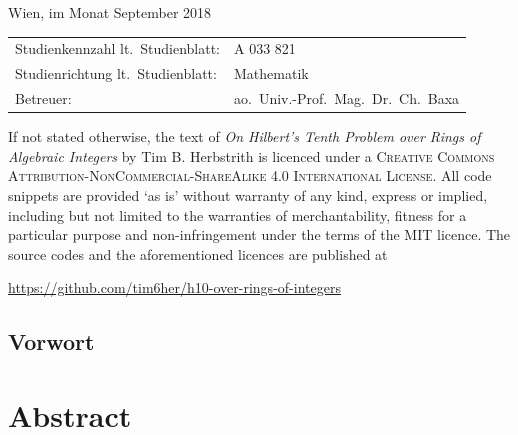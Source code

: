 \begin{titlepage}
\begin{center}
\vspace{1.5cm}

\noindent\textsf{Wien, im Monat September 2018}
\vfill

\noindent\begin{tabular}{@{}ll}
\textsf{Studienkennzahl lt.\ Studienblatt:}
&
\textsf{A 033 821}  %
\\
\textsf{Studienrichtung lt.\ Studienblatt:}
&
\textsf{Mathematik}  %
\\
\textsf{Betreuer: }
&
\textsf{ao.~Univ.-Prof.~Mag.~Dr.~Ch.~Baxa}  %
\end{tabular}
\end{center}
\end{titlepage}

\newpage%
\thispagestyle{empty}%
\vspace*{\fill}%
\noindent%
\begin{footnotesize}%
If not stated otherwise, the text of \emph{On Hilbert's Tenth Problem over Rings
of Algebraic Integers} by Tim B. Herbstrith is licenced under a \textsc{Creative
Commons Attribution-NonCommercial-ShareAlike 4.0 International License}. All
code snippets are provided `as is' without warranty of any kind, express or
implied, including but not limited to the warranties of merchantability, fitness
for a particular purpose and non-infringement under the terms of the
\textsc{MIT} licence. The source codes and the aforementioned licences are
published at
\begin{center}
 \url{https://github.com/tim6her/h10-over-rings-of-integers}
\end{center}
\end{footnotesize}
\cleardoublepage


\begin{german}
\section*{Vorwort}
\end{german}

\vspace{1.5cm}

\section*{Abstract}
\newpage
\thispagestyle{empty}
\tableofcontents
